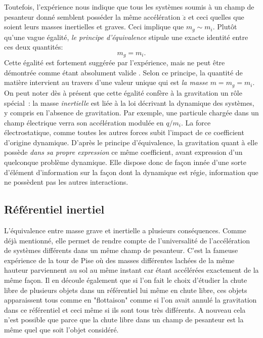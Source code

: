 Toutefois, l'expérience nous indique que tous les systèmes soumis à un champ de pesanteur donné semblent posséder la même accélération $\ddot z$ et ceci quelles que soient leurs masses inertielles et graves. Ceci implique que $m_g\sim m_i$. Plutôt qu'une vague égalité, \textit{le principe d'équivalence} stipule une exacte identité entre ces deux quantités:
\begin{equation}
m_g=m_i.
\end{equation}
Cette égalité est fortement suggérée par l'expérience, mais ne peut être démontrée comme étant absolument valide . Selon ce principe, la quantité de matière intervient au travers d'une valeur unique qui est \textit{la masse} $m=m_g=m_i$. On peut noter dès à présent que cette égalité confère à la gravitation un rôle spécial~: la masse \textit{inertielle} est liée à la loi décrivant la dynamique des systèmes, y compris en l'absence de gravitation. Par exemple, une particule chargée dans un champ électrique verra son accélération modulée en $q/m_i$. La force électrostatique, comme toutes les autres forces subit l'impact de ce coefficient d'origine dynamique. D'après le principe d'équivalence, la gravitation quant à elle possède \textit{dans sa propre expression} ce même coefficient, avant expression d'un quelconque problème dynamique. Elle dispose donc de façon innée d'une sorte d'élément d'information sur la façon dont la dynamique est régie, information que ne possèdent pas les autres interactions.

\subsection{Référentiel inertiel}
L'équivalence entre masse grave et inertielle a plusieurs conséquences. Comme déjà mentionné, elle permet de rendre compte de l'universalité de l'accélération de systèmes différents dans un même champ de pesanteur. C'est la fameuse expérience de la tour de Pise où des masses différentes lachées de la même hauteur parviennent au sol au même instant car étant accélérées exactement de la même façon. Il en découle également que si l'on fait le choix d'étudier la chute libre de plusieurs objets dans un référentiel lui même en chute libre, ces objets apparaissent tous comme en "flottaison" comme si l'on avait annulé la gravitation dans ce référentiel et ceci même si ils sont tous très différents. A nouveau cela n'est possible que parce que la chute libre dans un champ de pesanteur est la même quel que soit l'objet considéré. 

